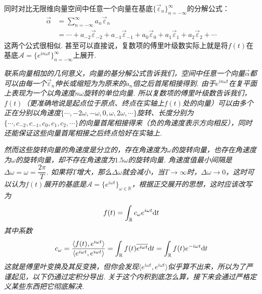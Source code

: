 \documentclass[main.tex]{subfiles}
\begin{document}
同时对比无限维向量空间中任意一个向量在基底\(\{\vec{\varepsilon}_n\}_{n=-\infty}^{\infty}\)的分解公式：
\begin{align*}
    \vec{\alpha} &= \sum_{n=-\infty}^{\infty}a_n\vec{\varepsilon}_n \\
    &= \cdots + a_{-2}\vec{\varepsilon}_{-2} + a_{-1}\vec{\varepsilon}_{-1} + a_{0}\vec{\varepsilon}_{0} + a_{1}\vec{\varepsilon}_{1} + a_{2}\vec{\varepsilon}_{2} + \cdots
\end{align*}
这两个公式很相似. 甚至可以直接说，复数项的傅里叶级数实际上就是将\(f(t)\)在基底\(\mathcal{A}=\{e^{in\omega t}\}_{n=-\infty}^{\infty}\)上展开.

\textit{
    联系向量相加的几何意义，向量的基分解公式告诉我们，空间中任意一个向量\(\vec{\alpha}\)都可以由每一个\(\vec{\varepsilon}_n\)伸长或缩短为为原来的\(a_n\)倍之后首尾相接得到. 由于\(e^{in\omega t}\)在复平面上表现为一个以角速度\(n\omega\)旋转的单位向量. 所以复数项的傅里叶级数告诉我们，\(f(t)\)（更准确地说是起点位于原点、终点在实轴上\(f(t)\)处的向量）可以由多个正在分别以角速度\(\{\cdots, -2\omega, -\omega, 0, \omega, 2\omega, \cdots\}\)旋转、长度分别为\(\{\cdots, c_{-2}, c_{-1}, c_0, c_1, c_2, \cdots\}\)的向量首尾相接得来（负的角速度表示方向相反），同时还能保证这些向量首尾相接之后终点恰好在实轴上.
}

\textit{
    然而这些旋转向量的角速度是分立的，存在角速度为\(\omega\)的旋转向量，也存在角速度为\(\omega\)的旋转向量，却不存在角速度为\(1.5\omega\)的旋转向量. 角速度值最小间隔是\(\Delta \omega = \omega =\dfrac{2\pi}{T}\). 如果将\(T\)增大，那么\(\Delta \omega\)就会减小，当\(T\to\infty\)时，\(\Delta \omega \to 0\)，这时可以认为\(f(t)\)展开的基底是\(\mathcal{A}=\{e^{i\omega t}\}_{\omega \in \mathbb{R}}\)，根据正交展开的思想，这时应该改写为
    \[f(t)=\int_{\mathbb{R}}c_\omega e^{i\omega t}{\rm d}t\]
    其中系数
    \[c_\omega = \frac{\langle f(t), e^{i\omega t} \rangle}{\langle e^{i\omega t},e^{i \omega t} \rangle} = \int_{\mathbb{R}}f(t)\overline{e^{i\omega t}}{\rm d}t=\int_{\mathbb{R}}f(t)e^{-i\omega t}{\rm d}t\]
    这就是傅里叶变换及其反变换，但你会发现\(\langle e^{i\omega t},e^{i \omega t} \rangle\)似乎算不出来，所以为了严谨起见，以下仍通过定积分导出. 关于这个内积到底怎么算，接下来会通过严格定义某些东西把它彻底解决.
}

\vspace{0.5cm}
\end{document}
